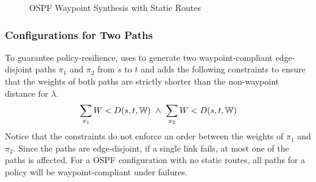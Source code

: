 \begin{figure}[t]
\centering
	\begin{minipage}{0.62\columnwidth}
		\begin{algorithm}[H]
			\begin{footnotesize} 
				\caption{OSPF Waypoint Synthesis with Static Routes}
				\label{alg:wayptunsat}
				\begin{algorithmic}[1]
					\EndWhile
					\EndProcedure
				\end{algorithmic}
			\end{footnotesize}
		\end{algorithm}
	\end{minipage}
\end{figure}

\subsubsection{Configurations for Two Paths} \label{sec:ospfresilience} \hspace*{4mm}


To guarantee policy-resilience, \name
uses \genesis to generate two waypoint-compliant 
edge-disjoint paths $\pi_1$ and $\pi_2$ from $s$ to $t$
and
adds the following constraints
 to ensure that the  weights 
of both paths are strictly shorter than 
the non-waypoint distance for $\lambda$. 
\begin{equation} \label{eq:resilience}
\sum_{\pi_1}W < D(s,t,\mathbb{W}) ~\wedge~ \sum_{\pi_2}W < D(s,t,\mathbb{W}) 
\end{equation}
Notice that the constraints do not enforce an order between the weights of $\pi_1$ and $\pi_2$.
Since the paths are edge-disjoint, if a single link fails, at most one 
of the paths is affected.  
For a OSPF configuration with no static routes,
all paths for a policy will be waypoint-compliant under failures.


